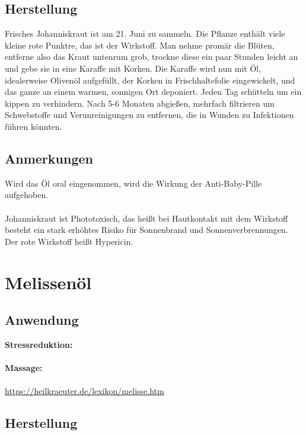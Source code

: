 \subsection{Herstellung}

Frisches Johanniskraut ist am 21. Juni zu sammeln. Die Pflanze enthält viele kleine rote Punktre, das ist der Wirkstoff. Man nehme promär die Blüten, entferne also das Kraut untenrum grob, trockne diese ein paar Stunden leicht an und gebe sie in eine Karaffe mit Korken. Die Karaffe wird nun mit Öl, idealerweise Olivenöl aufgefüllt, der Korken in Frischhaltefolie eingewickelt, und das ganze an einem warmen, sonnigen Ort deponiert. Jeden Tag schütteln um ein kippen zu verhindern. Nach 5-6 Monaten abgießen, mehrfach filtrieren um Schwebstoffe und Verunreinigungen zu entfernen, die in Wunden zu Infektionen führen könnten.

\subsection{Anmerkungen}

Wird das Öl oral eingenommen, wird die Wirkung der Anti-Baby-Pille aufgehoben.\\ \\
Johanniskraut ist Phototoxisch, das heißt bei Hautkontakt mit dem Wirkstoff besteht ein stark erhöhtes Risiko für Sonnenbrand und Sonnenverbrennungen.\\
Der rote Wirkstoff heißt Hypericin.


\section{Melissenöl}

\subsection{Anwendung}

\textbf{Stressreduktion:} \\ \\
\textbf{Massage:} \\ \\

\cite{heilkraeuterlexikon} \url{https://heilkraeuter.de/lexikon/melisse.htm}

\subsection{Herstellung}

